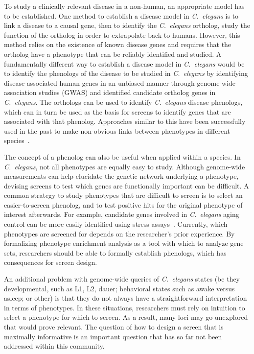 \documentclass[10pt, onecolumn]{article}
\newcommand{\cel}{\emph{C.~elegans}}
\begin{document}
To study a clinically relevant disease in a non-human, an appropriate model has
to be established. One method to establish a disease model
in \cel{} is to link a disease to a causal gene, then to identify the
\cel{} ortholog, study the function of the ortholog in order to
extrapolate back to humans. However, this method relies on the existence of
known disease genes and requires that the ortholog have a phenotype that can be
reliably identified and studied. A fundamentally different way to establish a
disease model in \cel{} would be to identify the phenologs of the disease to be
studied in \cel{} by identifying disease-associated human genes in an unbiased
manner through genome-wide association studies (GWAS) and identified candidate
ortholog genes in \cel{}. The orthologs can be used to identify \cel{} disease
phenologs, which can in turn be used as the basis for screens to identify genes
that are associated with that phenolog. Approaches similar to this have been
successfully used in the past to make non-obvious links between phenotypes in
different species~\cite{McGary2010}.

The concept of a phenolog can also be useful when applied within a species. In
\cel{}, not all phenotypes are equally easy to study. Although genome-wide
measurements can help elucidate the genetic network underlying a phenotype,
devising screens to test which genes are functionally important can be
difficult. A common strategy to study phenotypes that are difficult to screen is
to select an easier-to-screen phenolog, and to test positive hits for the original
phenotype of interest afterwards. For example, candidate genes involved in \cel{}
aging control can be more easily identified using stress
assays~\cite{Kim2007a,Mehta2009}. Currently, which phenotypes are screened for
depends on the researcher's prior experience. By formalizing phenotype enrichment
analysis as a tool with which to analyze gene sets, researchers should be able
to formally establish phenologs, which has consequences for screen design.

An additional problem with genome-wide queries of \cel{} states (be they
developmental, such as L1, L2, dauer; behavioral states such as awake versus
asleep; or other) is that they do not always have a straightforward
interpretation in terms of phenotypes. In these situations, researchers must
rely on intuition to select a phenotype for which to screen. As a result, many
loci may go unexplored that would prove relevant. The question of how to design
a screen that is maximally informative is an important question that has so far
not been addressed within this community.
\end{document}
